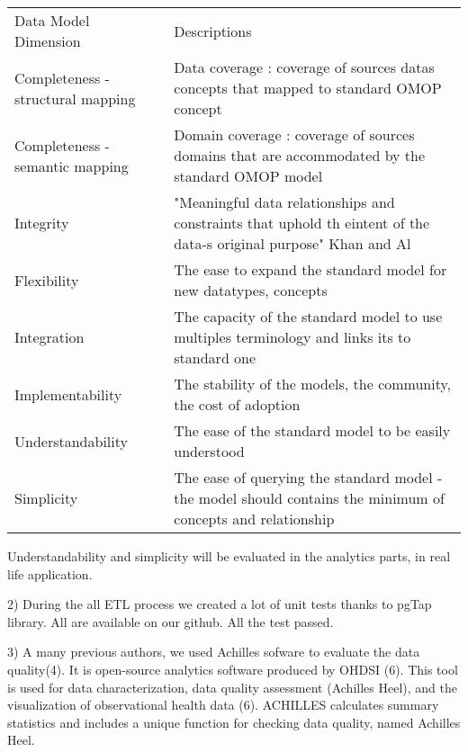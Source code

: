 \begin{table}[]
\begin{tabular}{ll}
Data Model Dimension              & Descriptions                                                                                                      \\
Completeness - structural mapping & Data coverage : coverage of sources datas concepts that mapped to standard OMOP concept                           \\
Completeness - semantic mapping   & Domain coverage : coverage of sources domains that are accommodated by the standard OMOP model                    \\
Integrity                         & "Meaningful data relationships and constraints that uphold th eintent of the data-s original purpose" Khan and Al \\
Flexibility                       & The ease to expand the standard model for new datatypes, concepts                                                 \\
Integration                       & The capacity of the standard model to use multiples terminology and links its to standard one                     \\
Implementability                  & The stability of the models, the community, the cost of adoption                                                  \\
Understandability                 & The ease of the standard model to be easily understood                                                            \\
Simplicity                        & The ease of querying the standard model - the model should contains the minimum of concepts and relationship     
\end{tabular}
\end{table}

Understandability and simplicity will be evaluated in the analytics parts, in real life application.

2) 
During the all ETL process we created a lot of unit tests thanks to pgTap library. All are available on our github. All the test passed.

3)
A many previous authors, we used Achilles sofware to evaluate the data quality(4). It is open-source analytics software produced by OHDSI (6).
This tool is used for data characterization, data quality assessment (Achilles Heel), and the visualization of observational health data (6).
ACHILLES calculates summary statistics and includes a unique function for checking data quality, named Achilles Heel. 

